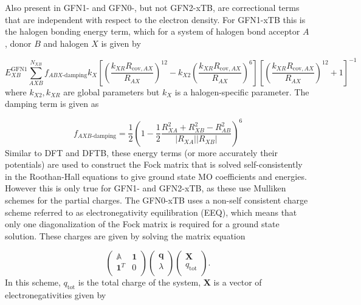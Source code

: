 Also present in GFN1- and GFN0-, but not GFN2-xTB, are correctional terms that are
independent with respect to the electron density. For GFN1-xTB this is the halogen
bonding energy term, which for a system of halogen bond acceptor $A$, donor $B$ and
halogen $X$ is given by

\begin{equation}
    E_{XB}^{\text{GFN}1} \sum^{N_{XB}}_{AXB} f_{ABX\text{-damping}} k_X \left[ \left( \frac{k_{XR} R_{\text{cov}, AX}}{R_{AX}}\right)^{12} - k_{X2} \left(\frac{k_{XR} R_{\text{cov}, AX}}{R_{AX}}\right)^6 \right] \left[ \left( \frac{k_{XR} R_{\text{cov}, AX}}{R_{AX}}\right)^{12} + 1\right]^{-1}
\end{equation}
%
where $k_{X2}, k_{XR}$ are global parameters but $k_X$ is a halogen-specific parameter.
The damping term is given as

\begin{equation}
    f_{AXB\text{-damping}} = \frac{1}{2} \left(1 - \frac{1}{2} \frac{R^2_{XA} + R^2_{XB} - R^2_{AB}}{\left\lvert R_{XA} \right\rvert \left\lvert R_{XB} \right\rvert} \right) ^6
\end{equation}
%
Similar to DFT and DFTB, these energy terms (or more accurately their potentials)
are used to construct the Fock matrix that is solved self-consistently in the Roothan-Hall
equations to give ground state MO coefficients and energies. However this is only
true for GFN1- and GFN2-xTB, as these use Mulliken schemes for the partial charges.
The GFN0-xTB uses a non-self consistent charge scheme referred to as electronegativity
equilibration (EEQ), which means that only one diagonalization of the Fock matrix
is required for a ground state solution. These charges are given by solving the 
matrix equation

\begin{equation}
    \label{eq:eeq_solve}
    \begin{pmatrix}
        \mathbb{A} & \mathbf{1} \\
        \mathbf{1}^T & 0 \\
    \end{pmatrix}
    \begin{pmatrix}
        \mathbf{q} \\
        \lambda \\
    \end{pmatrix}
    \begin{pmatrix}
        \mathbf{X} \\
        q_\text{tot} \\
    \end{pmatrix}.
\end{equation}
%
In this scheme, $q_\text{tot}$ is the total charge of the system, $\mathbf{X}$ is
a vector of electronegativities given by

